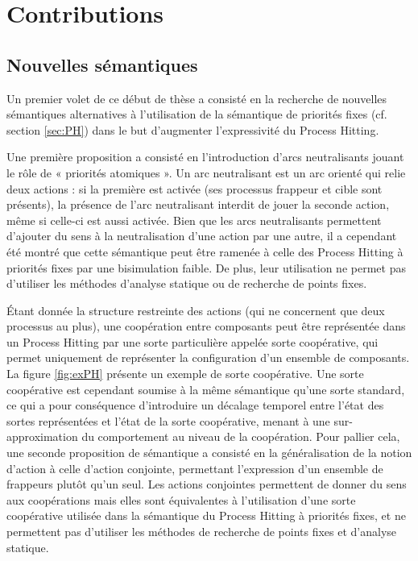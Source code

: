 \chapter{Contributions}

\section{Nouvelles sémantiques}\label{sec:semantiques}
Un premier volet de ce début de thèse a consisté en la recherche de nouvelles sémantiques alternatives à l'utilisation de la sémantique de priorités fixes (cf. section \ref{sec:PH}) dans le but d'augmenter l'expressivité du Process Hitting.

Une première proposition a consisté en l'introduction d'arcs neutralisants jouant le rôle de « priorités atomiques ».
Un arc neutralisant est un arc orienté qui relie deux actions :
si la première est activée (\ie ses processus frappeur et cible sont présents), la présence de l'arc neutralisant interdit de jouer la seconde action, même si celle-ci est aussi activée.
Bien que les arcs neutralisants permettent d'ajouter du sens à la neutralisation d'une action par une autre, il a cependant été montré que cette sémantique peut être ramenée à celle des Process Hitting à priorités fixes par une bisimulation faible.
De plus, leur utilisation ne permet pas d'utiliser les méthodes d'analyse statique ou de recherche de points fixes.


Étant donnée la structure restreinte des actions (qui ne concernent que deux processus au plus), une coopération entre composants peut être représentée dans un Process Hitting par une sorte particulière appelée sorte coopérative, qui permet uniquement de représenter la configuration d'un ensemble de composants.
La figure \ref{fig:exPH} présente un exemple de sorte coopérative.
Une sorte coopérative est cependant soumise à la même sémantique qu'une sorte standard, ce qui a pour conséquence d'introduire un décalage temporel entre l'état des sortes représentées et l'état de la sorte coopérative, menant à une sur-approximation du comportement au niveau de la coopération.
Pour pallier cela, une seconde proposition de sémantique a consisté en la généralisation de la notion d'action à celle d'action conjointe, permettant l'expression d'un ensemble de frappeurs plutôt qu'un seul.
Les actions conjointes permettent de donner du sens aux coopérations mais elles sont équivalentes à l'utilisation d'une sorte coopérative utilisée dans la sémantique du Process Hitting à priorités fixes, et ne permettent pas d'utiliser les méthodes de recherche de points fixes et d'analyse statique.

